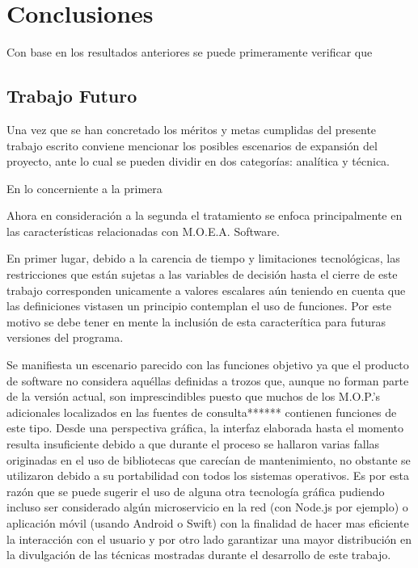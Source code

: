 \documentclass[class=report, crop=false]{standalone}
\begin{document}
\chapter{Conclusiones}
Con base en los resultados anteriores se puede 
primeramente verificar que

\section{Trabajo Futuro}
Una vez que se han concretado los méritos y metas cumplidas del 
presente trabajo escrito conviene mencionar los posibles escenarios 
de expansión del proyecto, ante lo cual se pueden dividir en dos 
categorías: analítica y técnica.

En lo concerniente a la primera

Ahora en consideración a la segunda el tratamiento se enfoca 
principalmente en las características relacionadas con M.O.E.A. 
Software.

En primer lugar, debido a la carencia de tiempo y limitaciones 
tecnológicas, las restricciones que están sujetas a las 
variables de decisión hasta el cierre de este trabajo corresponden 
unicamente a valores escalares aún teniendo en cuenta que las 
definiciones vistasen un principio contemplan el uso de funciones. 
Por este motivo se debe tener en mente la inclusión de esta 
caracterítica para futuras versiones del programa.

Se manifiesta un escenario parecido con las funciones objetivo 
ya que el producto de software no considera aquéllas definidas a 
trozos que, aunque no forman parte de la versión actual, son 
imprescindibles puesto que muchos de los M.O.P.’s adicionales 
localizados en las fuentes de consulta****** contienen funciones 
de este tipo.
Desde una perspectiva gráfica, la interfaz elaborada hasta el 
momento resulta insuficiente debido a que durante el proceso se 
hallaron varias fallas originadas en el uso de bibliotecas que 
carecían de mantenimiento, no obstante se utilizaron debido a su 
portabilidad con todos los sistemas operativos.
Es por esta razón que se puede sugerir el uso de alguna otra 
tecnología gráfica pudiendo incluso ser considerado algún 
microservicio en la red (con Node.js por ejemplo) o aplicación 
móvil (usando Android o Swift) con la finalidad de hacer mas 
eficiente la interacción con el usuario y por otro lado garantizar 
una mayor distribución en la divulgación de las técnicas mostradas 
durante el desarrollo de este trabajo.

\end{document}
